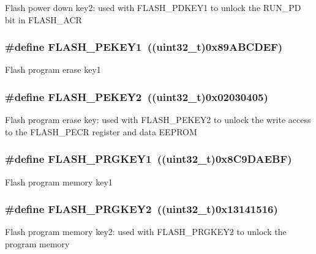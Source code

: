 Flash power down key2\-: used with F\-L\-A\-S\-H\-\_\-\-P\-D\-K\-E\-Y1 to unlock the R\-U\-N\-\_\-\-P\-D bit in F\-L\-A\-S\-H\-\_\-\-A\-C\-R \hypertarget{group___f_l_a_s_h___keys_ga50e1cb8dd47ab7b9bbe531bccb5b262b}{
\subsubsection[{F\-L\-A\-S\-H\-\_\-\-P\-E\-K\-E\-Y1}]{\setlength{\rightskip}{0pt plus 5cm}\#define F\-L\-A\-S\-H\-\_\-\-P\-E\-K\-E\-Y1~((uint32\-\_\-t)0x89\-A\-B\-C\-D\-E\-F)}}\label{group___f_l_a_s_h___keys_ga50e1cb8dd47ab7b9bbe531bccb5b262b}
Flash program erase key1 \hypertarget{group___f_l_a_s_h___keys_gaaa95bd33920501ae2c1c75af583aaadf}{
\subsubsection[{F\-L\-A\-S\-H\-\_\-\-P\-E\-K\-E\-Y2}]{\setlength{\rightskip}{0pt plus 5cm}\#define F\-L\-A\-S\-H\-\_\-\-P\-E\-K\-E\-Y2~((uint32\-\_\-t)0x02030405)}}\label{group___f_l_a_s_h___keys_gaaa95bd33920501ae2c1c75af583aaadf}
Flash program erase key\-: used with F\-L\-A\-S\-H\-\_\-\-P\-E\-K\-E\-Y2 to unlock the write access to the F\-L\-A\-S\-H\-\_\-\-P\-E\-C\-R register and data E\-E\-P\-R\-O\-M \hypertarget{group___f_l_a_s_h___keys_ga5b5a46beaf436509b0baf958cd4160f1}{
\subsubsection[{F\-L\-A\-S\-H\-\_\-\-P\-R\-G\-K\-E\-Y1}]{\setlength{\rightskip}{0pt plus 5cm}\#define F\-L\-A\-S\-H\-\_\-\-P\-R\-G\-K\-E\-Y1~((uint32\-\_\-t)0x8\-C9\-D\-A\-E\-B\-F)}}\label{group___f_l_a_s_h___keys_ga5b5a46beaf436509b0baf958cd4160f1}
Flash program memory key1 \hypertarget{group___f_l_a_s_h___keys_gac76fe21297ad4b8563ad02ddd6cda42f}{
\subsubsection[{F\-L\-A\-S\-H\-\_\-\-P\-R\-G\-K\-E\-Y2}]{\setlength{\rightskip}{0pt plus 5cm}\#define F\-L\-A\-S\-H\-\_\-\-P\-R\-G\-K\-E\-Y2~((uint32\-\_\-t)0x13141516)}}\label{group___f_l_a_s_h___keys_gac76fe21297ad4b8563ad02ddd6cda42f}
Flash program memory key2\-: used with F\-L\-A\-S\-H\-\_\-\-P\-R\-G\-K\-E\-Y2 to unlock the program memory 